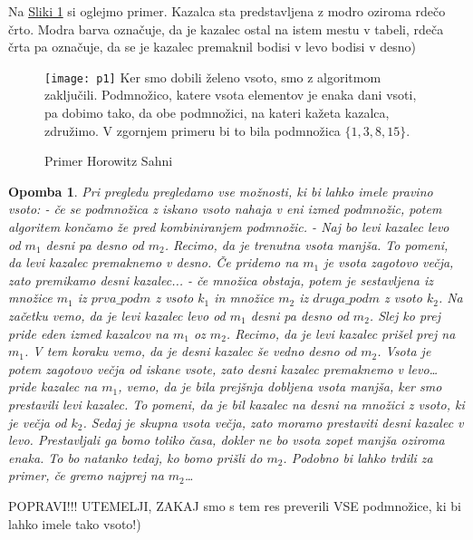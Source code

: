 \documentclass[12pt]{article}
\newtheorem{Opomba}[Izrek]{{\sc Opomba}}
\newenvironment{opomba}{\begin{Opomba}\rm}{\end{Opomba}}
\begin{document}
Na \hyperref[sec:slika1]{Sliki 1} si oglejmo primer. Kazalca sta predstavljena z modro oziroma rdečo črto. Modra barva označuje, da 
je kazalec ostal na istem mestu v tabeli, rdeča črta pa označuje, da se je kazalec premaknil bodisi v levo bodisi v desno) 
\newline
\begin{figure}[h] \label{sec:slika1}
  \caption{Primer Horowitz Sahni}
  \texttt{[image: p1]}
  \newline
  \newline
  Ker smo dobili želeno vsoto, smo z algoritmom zaključili.
  Podmnožico, katere vsota elementov je enaka dani vsoti, pa dobimo tako,
  da obe podmnožici, na kateri kažeta kazalca, združimo.\newline
  V zgornjem primeru bi to bila podmnožica $\{1,3,8,15\}$.
\end{figure}
\begin{opomba}
  Pri pregledu pregledamo vse možnosti, ki bi lahko imele pravino vsoto:
  - če se podmnožica z iskano vsoto nahaja v eni izmed podmnožic, potem algoritem končamo že 
  pred kombiniranjem podmnožic.
  - Naj bo levi kazalec levo od $m_1$ desni pa desno od $m_2$.
  Recimo, da je trenutna vsota manjša. To pomeni, da levi kazalec premaknemo v desno. Če pridemo na $m_1$ je vsota zagotovo večja, zato premikamo
  desni kazalec... 
  - če množica obstaja, potem je sestavljena iz množice $m_1$ iz $prva\_podm$ z vsoto $k_1$ in 
  množice $m_2$ iz  $druga\_podm$ z vsoto $k_2$. Na začetku vemo, da je levi kazalec levo od $m_1$ desni pa desno od $m_2$.
  Slej ko prej pride eden izmed kazalcov na $m_1$ oz $m_2$. Recimo, da je levi kazalec prišel prej na $m_1$. V tem koraku vemo, da je desni kazalec
  še vedno desno od $m_2$. Vsota je potem zagotovo večja od iskane vsote, zato desni kazalec premaknemo v levo\dots
  pride kazalec na $m_1$, vemo, da je bila prejšnja dobljena vsota manjša, ker smo prestavili levi kazalec. To pomeni, da je bil kazalec 
  na desni na množici z vsoto, ki je večja od $k_2$. Sedaj je skupna vsota večja, zato moramo prestaviti desni kazalec v levo.
  Prestavljali ga bomo toliko časa, dokler ne bo vsota zopet manjša oziroma enaka.
  To bo natanko tedaj, ko bomo prišli do $m_2$. Podobno bi lahko trdili za primer, če gremo najprej na $m_2$\dots

  

\end{opomba}
POPRAVI!!! UTEMELJI, ZAKAJ smo s tem res preverili VSE podmnožice, ki bi lahko imele tako vsoto!)
\end{document}

